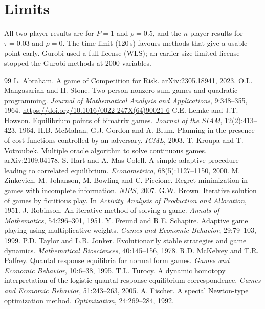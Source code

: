 \documentclass[10pt,a4paper]{article}
\begin{document}
\section{Limits}

All two-player results are for $P=1$ and $\rho=0.5$, and the $n$-player results for $\tau=0.03$ and
$\rho=0$. The time limit (120\,s) favours methods that give a usable point early. Gurobi used a
full license (WLS); an earlier size-limited license stopped the Gurobi methods at 2000 variables.

\begin{thebibliography}{99}\small
{} L. Abraham. A game of Competition for Risk. arXiv:2305.18941, 2023.
 O.L. Mangasarian and H. Stone. Two-person nonzero-sum games and quadratic programming. \emph{Journal of Mathematical Analysis and Applications}, 9:348--355, 1964. \url{https://doi.org/10.1016/0022-247X(64)90021-6}
 C.E. Lemke and J.T. Howson. Equilibrium points of bimatrix games. \emph{Journal of the SIAM}, 12(2):413--423, 1964.
 H.B. McMahan, G.J. Gordon and A. Blum. Planning in the presence of cost functions controlled by an adversary. \emph{ICML}, 2003.
 T. Kroupa and T. Votroubek. Multiple oracle algorithm to solve continuous games. arXiv:2109.04178.
 S. Hart and A. Mas-Colell. A simple adaptive procedure leading to correlated equilibrium. \emph{Econometrica}, 68(5):1127--1150, 2000.
 M. Zinkevich, M. Johanson, M. Bowling and C. Piccione. Regret minimization in games with incomplete information. \emph{NIPS}, 2007.
 G.W. Brown. Iterative solution of games by fictitious play. In \emph{Activity Analysis of Production and Allocation}, 1951.
 J. Robinson. An iterative method of solving a game. \emph{Annals of Mathematics}, 54:296--301, 1951.
 Y. Freund and R.E. Schapire. Adaptive game playing using multiplicative weights. \emph{Games and Economic Behavior}, 29:79--103, 1999.
 P.D. Taylor and L.B. Jonker. Evolutionarily stable strategies and game dynamics. \emph{Mathematical Biosciences}, 40:145--156, 1978.
 R.D. McKelvey and T.R. Palfrey. Quantal response equilibria for normal form games. \emph{Games and Economic Behavior}, 10:6--38, 1995.
 T.L. Turocy. A dynamic homotopy interpretation of the logistic quantal response equilibrium correspondence. \emph{Games and Economic Behavior}, 51:243--263, 2005.
 A. Fischer. A special Newton-type optimization method. \emph{Optimization}, 24:269--284, 1992.

\end{thebibliography}
\end{document}
